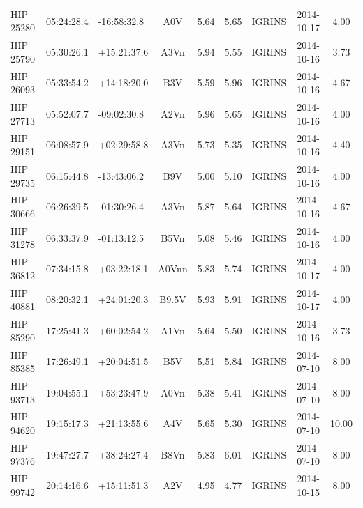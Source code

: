 \begin{scriptsize}
\begin{longtable}{lllcccrcc}
   HIP 25280 &  05:24:28.4 &  -16:58:32.8 &            A0V &     5.64 &     5.65 &     IGRINS &  2014-10-17 &            4.00 \\
   HIP 25790 &  05:30:26.1 &  +15:21:37.6 &           A3Vn &     5.94 &     5.55 &     IGRINS &  2014-10-16 &            3.73 \\
   HIP 26093 &  05:33:54.2 &  +14:18:20.0 &            B3V &     5.59 &     5.96 &     IGRINS &  2014-10-16 &            4.67 \\
   HIP 27713 &  05:52:07.7 &  -09:02:30.8 &           A2Vn &     5.96 &     5.65 &     IGRINS &  2014-10-16 &            4.00 \\
   HIP 29151 &  06:08:57.9 &  +02:29:58.8 &           A3Vn &     5.73 &     5.35 &     IGRINS &  2014-10-16 &            4.40 \\
   HIP 29735 &  06:15:44.8 &  -13:43:06.2 &            B9V &     5.00 &     5.10 &     IGRINS &  2014-10-16 &            4.00 \\
   HIP 30666 &  06:26:39.5 &  -01:30:26.4 &           A3Vn &     5.87 &     5.64 &     IGRINS &  2014-10-16 &            4.67 \\
   HIP 31278 &  06:33:37.9 &  -01:13:12.5 &           B5Vn &     5.08 &     5.46 &     IGRINS &  2014-10-16 &            4.00 \\
   HIP 36812 &  07:34:15.8 &  +03:22:18.1 &          A0Vnn &     5.83 &     5.74 &     IGRINS &  2014-10-17 &            4.00 \\
   HIP 40881 &  08:20:32.1 &  +24:01:20.3 &          B9.5V &     5.93 &     5.91 &     IGRINS &  2014-10-17 &            4.00 \\
   HIP 85290 &  17:25:41.3 &  +60:02:54.2 &           A1Vn &     5.64 &     5.50 &     IGRINS &  2014-10-16 &            3.73 \\
   HIP 85385 &  17:26:49.1 &  +20:04:51.5 &            B5V &     5.51 &     5.84 &     IGRINS &  2014-07-10 &            8.00 \\
   HIP 93713 &  19:04:55.1 &  +53:23:47.9 &           A0Vn &     5.38 &     5.41 &     IGRINS &  2014-07-10 &            8.00 \\
   HIP 94620 &  19:15:17.3 &  +21:13:55.6 &            A4V &     5.65 &     5.30 &     IGRINS &  2014-07-10 &            10.00 \\
   HIP 97376 &  19:47:27.7 &  +38:24:27.4 &           B8Vn &     5.83 &     6.01 &     IGRINS &  2014-07-10 &            8.00 \\
   HIP 99742 &  20:14:16.6 &  +15:11:51.3 &            A2V &     4.95 &     4.77 &     IGRINS &  2014-10-15 &            8.00 \\

\end{longtable}
\end{scriptsize}
